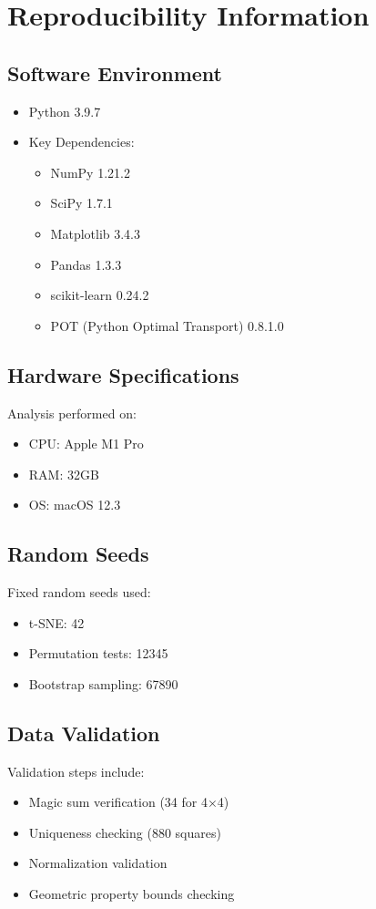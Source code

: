 \documentclass[11pt]{article}
\begin{document}
\section{Reproducibility Information}
\label{sec:reproducibility}

\subsection{Software Environment}
\begin{itemize}
    \item Python 3.9.7
    \item Key Dependencies:
    \begin{itemize}
        \item NumPy 1.21.2
        \item SciPy 1.7.1
        \item Matplotlib 3.4.3
        \item Pandas 1.3.3
        \item scikit-learn 0.24.2
        \item POT (Python Optimal Transport) 0.8.1.0
    \end{itemize}
\end{itemize}

\subsection{Hardware Specifications}
Analysis performed on:
\begin{itemize}
    \item CPU: Apple M1 Pro
    \item RAM: 32GB
    \item OS: macOS 12.3
\end{itemize}

\subsection{Random Seeds}
Fixed random seeds used:
\begin{itemize}
    \item t-SNE: 42
    \item Permutation tests: 12345
    \item Bootstrap sampling: 67890
\end{itemize}

\subsection{Data Validation}
Validation steps include:
\begin{itemize}
    \item Magic sum verification (34 for 4×4)
    \item Uniqueness checking (880 squares)
    \item Normalization validation
    \item Geometric property bounds checking
\end{itemize}
\end{document}
